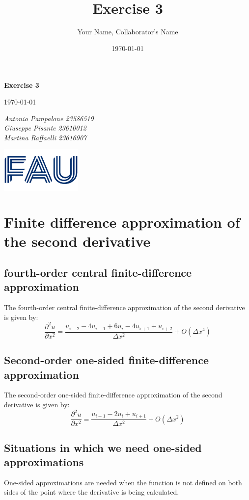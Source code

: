 \documentclass{article}
\title{Exercise 3}
\author{Your Name, Collaborator's Name}
\date{\today}
\begin{document}
\begin{titlepage}
    \centering
    \vspace*{1in}
    
    {\Huge\bfseries Exercise 3\par}
    \vspace{1.5cm}
    {\Large \today\par}
    \vspace{1.5cm}
    {\Large\itshape Antonio Pampalone 23586519 \\ Giuseppe Pisante 23610012\\ Martina Raffaelli 23616907 \par}
    
    \vfill
    \includegraphics[width=0.3\textwidth]{FAU-Logo.png}\par\vspace{1cm} %
   
\end{titlepage}

\newpage
\small
\section{Finite difference approximation of the second derivative}
\subsection{fourth-order central finite-difference approximation}
The fourth-order central finite-difference approximation of the second derivative is given by:
\[
\frac{\partial^2 u}{\partial x^2} = \frac{u_{i-2} - 4u_{i-1} + 6u_i - 4u_{i+1} + u_{i+2}}{\Delta x^2} + O(\Delta x^4)
\]

\subsection{Second-order one-sided finite-difference approximation}
The second-order one-sided finite-difference approximation of the second derivative is given by:
\[
\frac{\partial^2 u}{\partial x^2} = \frac{u_{i-1} - 2u_i + u_{i+1}}{\Delta x^2} + O(\Delta x^2)
\]

\subsection{Situations in which we need one-sided approximations}
One-sided approximations are needed when the function is not defined on both sides of the point where the derivative is being calculated.
\end{document}
